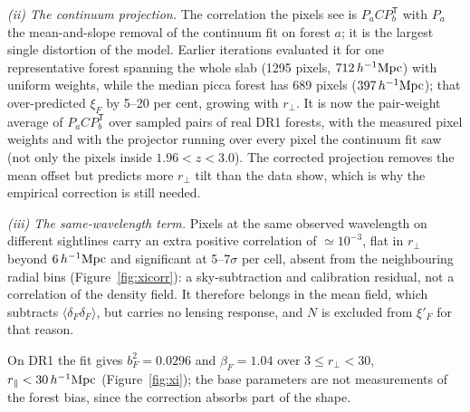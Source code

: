 \documentclass[11pt,a4paper]{article}
\newcommand{\dF}{\delta_F}
\newcommand{\Mpch}{\,h^{-1}{\rm Mpc}}
\begin{document}
\emph{(ii) The continuum projection.} The correlation the pixels see is $P_aCP_b^\mathsf{T}$ with $P_a$ the mean-and-slope removal of the continuum fit on forest $a$; it is the largest single distortion of the model. Earlier iterations evaluated it for one representative forest spanning the whole slab (1295 pixels, $712\Mpch$) with uniform weights, while the median picca forest has 689 pixels ($397\Mpch$); that over-predicted $\xi_F$ by 5--20 per cent, growing with $r_\perp$. It is now the pair-weight average of $P_aCP_b^\mathsf{T}$ over sampled pairs of real DR1 forests, with the measured pixel weights and with the projector running over every pixel the continuum fit saw (not only the pixels inside $1.96<z<3.0$). The corrected projection removes the mean offset but predicts more $r_\perp$ tilt than the data show, which is why the empirical correction is still needed.

\emph{(iii) The same-wavelength term.} Pixels at the same observed wavelength on different sightlines carry an extra positive correlation of $\simeq10^{-3}$, flat in $r_\perp$ beyond $6\Mpch$ and significant at 5--7$\sigma$ per cell, absent from the neighbouring radial bins (Figure~\ref{fig:xicorr}): a sky-subtraction and calibration residual, not a correlation of the density field. It therefore belongs in the mean field, which subtracts $\langle\dF\dF\rangle$, but carries no lensing response, and $N$ is excluded from $\xi'_F$ for that reason.

On DR1 the fit gives $b_F^2=0.0296$ and $\beta_F=1.04$ over $3\le r_\perp<30$, $r_\parallel<30\Mpch$ (Figure~\ref{fig:xi}); the base parameters are not measurements of the forest bias, since the correction absorbs part of the shape.
\end{document}
